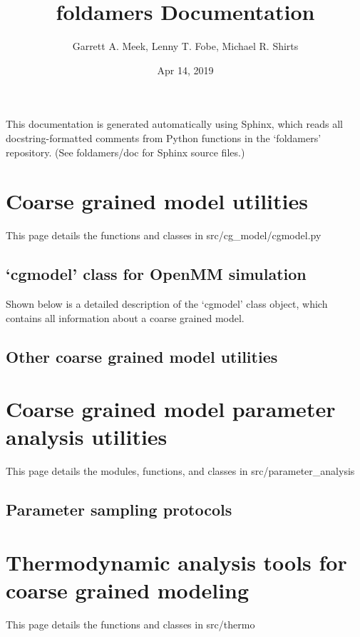 \documentclass[letterpaper,10pt,english,openany,oneside]{sphinxmanual}
\title{foldamers Documentation}
\date{Apr 14, 2019}
\author{Garrett A. Meek, Lenny T. Fobe, Michael R. Shirts}
\begin{document}
\pagestyle{empty}
\sphinxmaketitle
\pagestyle{plain}
\sphinxtableofcontents
\pagestyle{normal}
\label{\detokenize{index::doc}}


This documentation is generated automatically using Sphinx, which reads
all docstring-formatted comments from Python functions in
the ‘foldamers’ repository.  (See foldamers/doc for Sphinx
source files.)


\chapter{Coarse grained model utilities}
\label{\detokenize{cg_model:coarse-grained-model-utilities}}\label{\detokenize{cg_model::doc}}
This page details the functions and classes in src/cg\_model/cgmodel.py


\section{‘cgmodel’ class for OpenMM simulation}
\label{\detokenize{cg_model:cgmodel-class-for-openmm-simulation}}
Shown below is a detailed description of the ‘cgmodel’ class object,
which contains all information about a coarse grained model.


\section{Other coarse grained model utilities}
\label{\detokenize{cg_model:other-coarse-grained-model-utilities}}

\chapter{Coarse grained model parameter analysis utilities}
\label{\detokenize{parameter_analysis:coarse-grained-model-parameter-analysis-utilities}}\label{\detokenize{parameter_analysis::doc}}
This page details the modules, functions, and classes
in src/parameter\_analysis


\section{Parameter sampling protocols}
\label{\detokenize{parameter_analysis:parameter-sampling-protocols}}

\chapter{Thermodynamic analysis tools for coarse grained modeling}
\label{\detokenize{thermo:thermodynamic-analysis-tools-for-coarse-grained-modeling}}\label{\detokenize{thermo::doc}}
This page details the functions and classes in src/thermo
\end{document}
